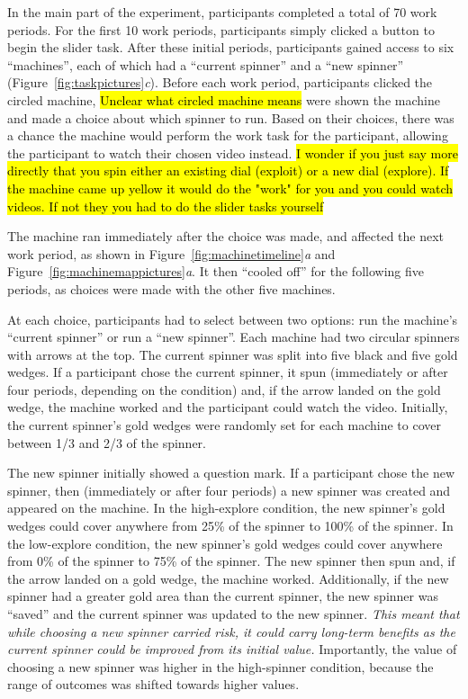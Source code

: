 \documentclass[10pt,letterpaper]{article}
\begin{document}
In the main part of the experiment, participants completed a total of 70 work
periods. For the first 10 work periods, participants simply clicked a button to begin the
slider task. After these initial periods, participants gained access to six
``machines'', each of which had a ``current spinner'' and a ``new spinner'' (Figure~\ref{fig:taskpictures}\emph{c}).
Before each work period, participants clicked the circled machine, \hl{Unclear what circled machine means}
were shown the machine and made a choice about which spinner to run. Based on their choices, there was a
chance the machine would perform the work task for the participant, allowing the
participant to watch their chosen video instead.
\hl{I wonder if you just say more directly that you spin either an existing dial (exploit) or a new
dial (explore).  If the machine came up yellow it would do the "work" for you and you could watch
videos.  If not they you had to do the slider tasks yourself}

The machine ran immediately after the choice was
made, and affected the next work period, as shown in
Figure~\ref{fig:machinetimeline}\emph{a} and Figure~\ref{fig:machinemappictures}\emph{a}. It then ``cooled off'' for the
following five periods, as choices were made with the other five machines.

At each choice, participants had to select between two options: run the
machine's ``current spinner'' or run a ``new spinner''. Each machine had two
circular spinners with arrows at the top. The current spinner was split into
five black and five gold wedges. If a participant chose the
current spinner, it spun (immediately or after four periods, depending
on the condition) and, if the arrow landed on the gold wedge, the machine
worked and the participant could watch the video. Initially, the
current spinner's gold wedges were randomly set for each machine to cover between
1/3 and 2/3 of the spinner.

The new spinner initially showed a question mark. If a participant chose the
new spinner, then (immediately or after four periods) a new spinner was
created and appeared on the machine. In the high-explore condition, the new spinner's gold wedges could cover
anywhere from 25\% of the spinner to 100\% of the spinner. In the low-explore condition, the new spinner's gold wedges could cover
anywhere from 0\% of the spinner to 75\% of the spinner. The new spinner then
spun and, if the arrow landed on a gold wedge, the machine worked.
Additionally, if the new spinner had a greater gold area than the current
spinner, the new spinner was ``saved'' and the current spinner was
updated to the new spinner.  \emph{This meant that
while choosing a new spinner carried risk, it could carry long-term
benefits as the current spinner could be improved from its initial value.}
Importantly, the value of choosing a new spinner was higher in the high-spinner
condition, because the range of outcomes was shifted towards higher values.
\end{document}

